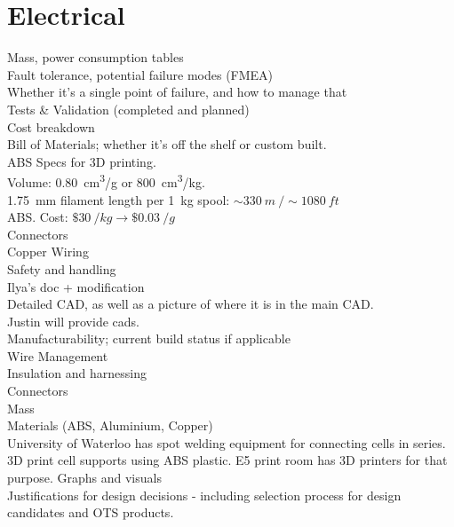 \documentclass[main.tex]{subfiles}
\begin{document}
    \section{Electrical}
    Mass, power consumption tables\\
    Fault tolerance, potential failure modes (FMEA)\\
    Whether it’s a single point of failure, and how to manage that\\
    Tests \& Validation (completed and planned)\\
    Cost breakdown\\
    Bill of Materials; whether it’s off the shelf or custom built.\\

    ABS Specs for 3D printing.\\
    Volume: \SI{0.80}{cm^3/g} or \SI{800}{cm^3/kg}.\\
    \SI{1.75}{mm} filament length per \SI{1}{kg} spool: $\sim \SI{330}{m}\ / \sim \SI{1080}{ft}$\\
    ABS. Cost: $\$\SI{30}{/kg} \rightarrow \$\SI{0.03}{/g}$\\

    Connectors\\

    Copper Wiring\\




    Safety and handling\\
    Ilya’s doc + modification\\
    Detailed CAD, as well as a picture of where it is in the main CAD.\\
    Justin will provide cads. \\
    Manufacturability; current build status if applicable\\
    Wire Management\\
    Insulation and harnessing\\
    Connectors\\
    Mass \\
    Materials (ABS, Aluminium, Copper)\\


    University of Waterloo has spot welding equipment for connecting cells in series.
    3D print cell supports using ABS plastic. E5 print room has 3D printers for that purpose.
    Graphs and visuals\\

    Justifications for design decisions - including selection process for design candidates and OTS products.\\
\end{document}
